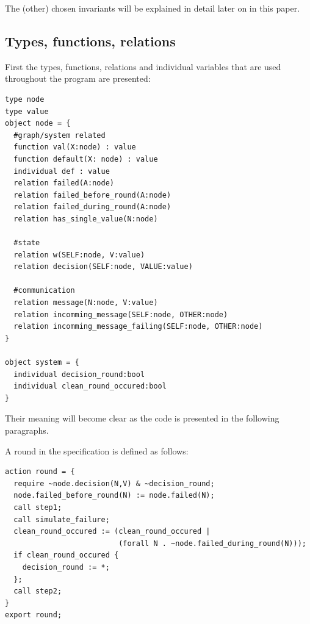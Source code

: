 \documentclass[fleqn]{article}
\begin{document}
\noindent The (other) chosen invariants will be explained in detail later on in this paper.

\subsection{Types, functions, relations}
First the types, functions, relations and individual variables that are used throughout the program are presented:


\begin{mdframed}[backgroundcolor=light-gray, roundcorner=10pt,leftmargin=1, rightmargin=1, innerleftmargin=15, innertopmargin=15,innerbottommargin=15, outerlinewidth=1, linecolor=light-gray]
\begin{lstlisting}
type node
type value
object node = {
  #graph/system related
  function val(X:node) : value
  function default(X: node) : value
  individual def : value
  relation failed(A:node)
  relation failed_before_round(A:node)
  relation failed_during_round(A:node)
  relation has_single_value(N:node)

  #state
  relation w(SELF:node, V:value)
  relation decision(SELF:node, VALUE:value)

  #communication
  relation message(N:node, V:value)
  relation incomming_message(SELF:node, OTHER:node)
  relation incomming_message_failing(SELF:node, OTHER:node)
}

object system = {
  individual decision_round:bool
  individual clean_round_occured:bool
}
\end{lstlisting}
\end{mdframed}

\noindent Their meaning will become clear as the code is presented in the following paragraphs.


\noindent A round in the specification is defined as follows:
\begin{mdframed}[backgroundcolor=light-gray, roundcorner=10pt,leftmargin=1, rightmargin=1, innerleftmargin=15, innertopmargin=15,innerbottommargin=15, outerlinewidth=1, linecolor=light-gray]
\begin{lstlisting}
action round = {
  require ~node.decision(N,V) & ~decision_round;
  node.failed_before_round(N) := node.failed(N);
  call step1;
  call simulate_failure;
  clean_round_occured := (clean_round_occured |
                          (forall N . ~node.failed_during_round(N)));
  if clean_round_occured {
    decision_round := *;
  };
  call step2;
}
export round;
\end{lstlisting}
\end{mdframed}
\end{document}
